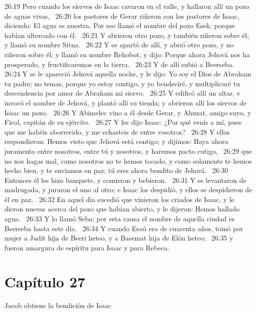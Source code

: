 26:19 Pero cuando los siervos de Isaac cavaron en el valle, y hallaron allí un pozo de aguas vivas,  
26:20 los pastores de Gerar riñeron con los pastores de Isaac, diciendo: El agua es nuestra. Por eso llamó el nombre del pozo Esek, porque habían altercado con él.  
26:21 Y abrieron otro pozo, y también riñeron sobre él; y llamó su nombre Sitna.  
26:22 Y se apartó de allí, y abrió otro pozo, y no riñeron sobre él; y llamó su nombre Rehobot, y dijo: Porque ahora Jehová nos ha prosperado, y fructificaremos en la tierra.  
26:23 Y de allí subió a Beerseba.  
26:24 Y se le apareció Jehová aquella noche, y le dijo: Yo soy el Dios de Abraham tu padre; no temas, porque yo estoy contigo, y yo bendeciré, y multiplicaré tu descendencia por amor de Abraham mi siervo.  
26:25 Y edificó allí un altar, e invocó el nombre de Jehová, y plantó allí su tienda; y abrieron allí los siervos de Isaac un pozo.  
26:26 Y Abimelec vino a él desde Gerar, y Ahuzat, amigo suyo, y Ficol, capitán de su ejército.  
26:27 Y les dijo Isaac: ¿Por qué venís a mí, pues que me habéis aborrecido, y me echasteis de entre vosotros?  
26:28 Y ellos respondieron: Hemos visto que Jehová está contigo; y dijimos: Haya ahora juramento entre nosotros, entre tú y nosotros, y haremos pacto cutigo,  
26:29 que no nos hagas mal, como nosotros no te hemos tocado, y como solamente te hemos hecho bien, y te enviamos en paz; tú eres ahora bendito de Jehová.  
26:30 Entonces él les hizo banquete, y comieron y bebieron.  
26:31 Y se levantaron de madrugada, y juraron el uno al otro; e Isaac los despidió, y ellos se despidieron de él en paz.  
26:32 En aquel día sucedió que vinieron los criados de Isaac, y le dieron nuevas acerca del pozo que habían abierto, y le dijeron: Hemos hallado agua.  
26:33 Y lo llamó Seba; por esta causa el nombre de aquella ciudad es Beerseba hasta este día.  
26:34 Y cuando Esaú era de cuarenta años, tomó por mujer a Judit hija de Beeri heteo, y a Basemat hija de Elón heteo;  
26:35 y fueron amargura de espíritu para Isaac y para Rebeca.  
\section*{Capítulo 27}
Jacob obtiene la bendición de Isaac  

